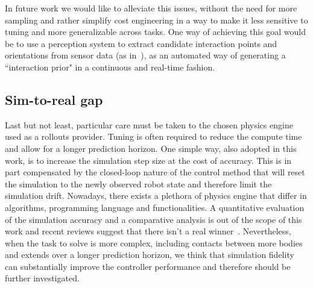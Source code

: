 In future work we would like to alleviate this issues, without the need for more sampling and rather simplify cost engineering in a way to make it less sensitive to tuning and more generalizable across tasks. One way of achieving this goal would be to use a perception system to extract candidate interaction points and orientations from sensor data (as in~\cite{nagarajan2019grounded}), as an automated way of generating a ``interaction prior" in a continuous and real-time fashion. 

\subsection{Sim-to-real gap}
Last but not least, particular care must be taken to the chosen physics engine used as a rollouts provider. Tuning is often required to reduce the compute time and allow for a longer prediction horizon. One simple way, also adopted in this work, is to increase the simulation step size at the cost of accuracy. This is in part compensated by the closed-loop nature of the control method that will reset the simulation to the newly observed robot state and therefore limit the simulation drift. Nowadays, there exists a plethora of physics engine that differ in algorithms, programming language and functionalities. A quantitative evaluation of the simulation accuracy and a comparative analysis is out of the scope of this work and recent reviews suggest that there isn't a real winner~\cite{collins2021review}. Nevertheless, when the task to solve is more complex, including contacts between more bodies and extends over a longer prediction horizon, we think that simulation fidelity can substantially improve the controller performance and therefore should be further investigated. 
